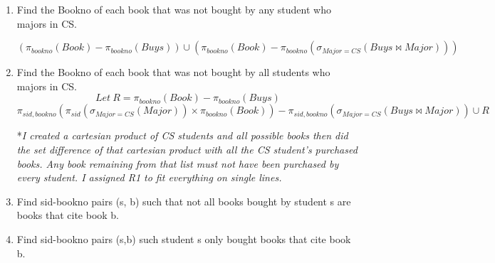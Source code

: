 \documentclass{article}
\begin{document}
\begin{enumerate}
    \item %
    Find the Bookno of each book that was not bought by any student who majors in CS.

    \begin{displaymath}
        (\pi_{bookno}(Book) - \pi_{bookno}(Buys)) \cup (\pi_{bookno}(Book) - \pi_{bookno}(\sigma_{Major=CS}(Buys \bowtie Major)))
    \end{displaymath}

    \item %
    Find the Bookno of each book that was not bought by all students who majors in CS.
    \begin{displaymath}
        Let\ R=\pi_{bookno}(Book) - \pi_{bookno}(Buys)
    \end{displaymath}
    \begin{displaymath}
        \pi_{sid, bookno}(\pi_{sid}(\sigma_{Major=CS}(Major)) \times \pi_{bookno}(Book)) - \pi_{sid, bookno}(\sigma_{Major=CS}(Buys \bowtie Major)) \cup R
    \end{displaymath}

    *\textit{I created a cartesian product of CS students and all possible books then did the set difference of that cartesian product
    with all the CS student's purchased books. Any book remaining from that list must not have been purchased by every student. I assigned R1 to fit everything on single lines.}

    \item %
    Find sid-bookno pairs (s, b) such that not all books bought by student s are books that cite book b.

    \item %
    Find sid-bookno pairs (s,b) such student s only bought books that cite book b.

\end{enumerate}
\end{document}
